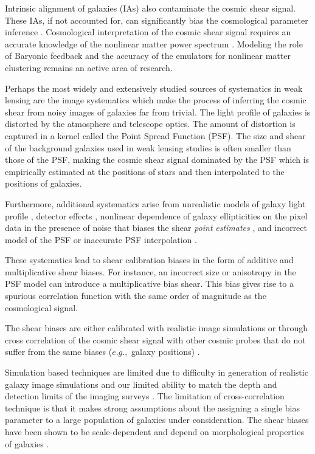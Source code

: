 Intrinsic alignment of galaxies (IAs) also contaminate the cosmic shear signal. These IAs, if not accounted for, 
can significantly bias the cosmological parameter inference \citep{codis2015,joachimi2015, kirk2015,krause_ia}. 
Cosmological interpretation of the cosmic shear signal requires an accurate knowledge of the nonlinear 
matter power spectrum \citep{semboloni2013, eifler2015, schaye2015, joudaki2016, kitching2016, mead2016}. Modeling the role of 
Baryonic feedback and the accuracy of the emulators for nonlinear matter clustering remains an active area of research. 

Perhaps the most widely and extensively studied sources of systematics in weak lensing are the image systematics which make 
the process of inferring the cosmic shear from noisy images of galaxies far from trivial. The light profile of 
galaxies is distorted by the atmosphere and telescope optics. The amount of distortion is captured in a kernel called 
the Point Spread Function (PSF). The size and shear of the background galaxies used in weak lensing studies is often 
smaller than those of the PSF, making the cosmic shear signal dominated by the PSF which is empirically estimated at 
the positions of stars and then interpolated to the positions of galaxies.  

Furthermore, additional systematics arise from unrealistic models of galaxy light profile \citep{voight2010,im3shape,kac2014}, 
detector effects \citep{arun2016,jaya2016,plazas2016}, nonlinear dependence of galaxy ellipticities 
on the pixel data in the presence of noise that biases the shear \emph{point} \emph{estimates} \citep{melchoir,great3,conti2017}, 
and incorrect model of the PSF or inaccurate PSF interpolation \citep{rowe2010,kuijken2015,great3,des}.

These systematics lead to shear calibration biases in the form of additive and multiplicative 
shear biases. For instance, an incorrect size or anisotropy in the PSF model can introduce 
a multiplicative bias shear. This bias gives rise to a spurious correlation function with the 
same order of magnitude as the cosmological signal.

The shear biases are either calibrated with realistic image simulations \citep{im3shape,jee2016,conti2017} or through cross correlation of 
the cosmic shear signal with other cosmic probes that do not suffer from the same biases ($e.g.,$ galaxy positions)
\citep{liu2016,schann,singh2017}. 

Simulation based techniques are limited due to difficulty in 
generation of realistic galaxy image simulations \citep{great3,lanus2017} and our limited ability to match the depth and detection limits of 
the imaging surveys \citep{hoekstra}. The limitation of cross-correlation technique is that it makes strong assumptions about the assigning a 
single bias parameter to a large population of galaxies under consideration. The shear biases have been shown to be scale-dependent \citep{des,jee2016} 
and depend on morphological properties of galaxies \citep{im3shape,conti2017}. 

